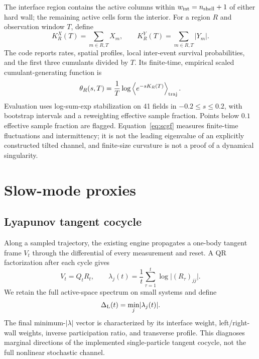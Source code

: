 \documentclass[aps,prb,onecolumn,nofootinbib,superscriptaddress]{revtex4-2}
\begin{document}
The interface region contains the active columns within
$w_{\rm int}=n_{\rm shell}+1$ of either hard wall; the remaining active cells
form the interior.  For a region $R$ and observation window $T$, define
\begin{equation}
 K_R^X(T)=\sum_{m\in R,T}X_m,\qquad
 K_R^Y(T)=\sum_{m\in R,T}\lvert Y_m\rvert.
\end{equation}
The code reports rates, spatial profiles, local inter-event survival
probabilities, and the first three cumulants divided by $T$.  Its finite-time,
empirical scaled cumulant-generating function is
\begin{equation}
 \theta_R(s,T)=\frac{1}{T}\log
 \left\langle e^{-sK_R(T)}\right\rangle_{\rm traj}.
 \label{eq:scgf}
\end{equation}
Evaluation uses log-sum-exp stabilization on 41 fields in
$-0.2\leq s\leq0.2$, with bootstrap intervals and a reweighting effective
sample fraction.  Points below $0.1$ effective sample fraction are flagged.
Equation~\eqref{eq:scgf} measures finite-time fluctuations and intermittency;
it is not the leading eigenvalue of an explicitly constructed tilted channel,
and finite-size curvature is not a proof of a dynamical singularity.

\section{Slow-mode proxies}

\subsection{Lyapunov tangent cocycle}

Along a sampled trajectory, the existing engine propagates a one-body tangent
frame $V_t$ through the differential of every measurement and reset.  A QR
factorization after each cycle gives
\begin{equation}
 V_t=Q_tR_t,\qquad
 \lambda_j(t)=\frac{1}{t}\sum_{\tau=1}^{t}\log\lvert(R_\tau)_{jj}\rvert.
\end{equation}
We retain the full active-space spectrum on small systems and define
\begin{equation}
 \Delta_{\rm L}(t)=\min_j\lvert\lambda_j(t)\rvert.
\end{equation}
The final minimum-$\lvert\lambda\rvert$ vector is characterized by its
interface weight, left/right-wall weights, inverse participation ratio, and
transverse profile.  This diagnoses marginal directions of the implemented
single-particle tangent cocycle, not the full nonlinear stochastic channel.
\end{document}
